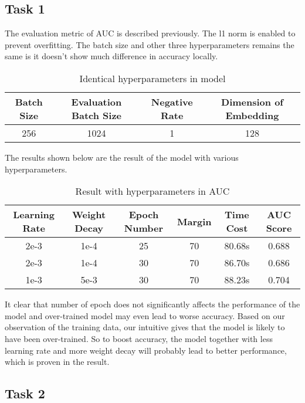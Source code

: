 \documentclass{article}
\begin{document}
\subsection{Task 1}

The evaluation metric of AUC is described previously. The l1 norm is enabled to prevent overfitting. The batch size and other three hyperparameters remains the same is it doesn't show much difference in accuracy locally.

\begin{table}[!htbp]
\setlength{\abovecaptionskip}{+0.2cm}
\setlength{\belowcaptionskip}{+0.2cm}
\centering
\caption{Identical hyperparameters in model}
\begin{tabular}{cccc}
\toprule
\textbf{Batch Size} & \textbf{Evaluation Batch Size} & \textbf{Negative Rate} & \textbf{Dimension of Embedding}\\
\midrule
256 & 1024 & 1 & 128 \\
\bottomrule
\end{tabular}
\end{table}

The results shown below are the result of the model with various hyperparameters. 
\begin{table}[!htbp]
\setlength{\abovecaptionskip}{+0.2cm}
\setlength{\belowcaptionskip}{+0.2cm}
\centering
\caption{Result with hyperparameters in AUC}
\begin{tabular}{cccccc}
\toprule
\textbf{Learning Rate} & \textbf{Weight Decay} & \textbf{Epoch Number} & \textbf{Margin} & \textbf{Time Cost} & \textbf{AUC Score} \\ 
\midrule
2e-3 & 1e-4 & 25 & 70 & 80.68s & 0.688 \\
2e-3 & 1e-4 & 30 & 70 & 86.70s & 0.686 \\
1e-3 & 5e-3 & 30 & 70 & 88.23s & 0.704 \\
\bottomrule
\end{tabular}
\end{table}

It clear that number of epoch does not significantly affects the
performance of the model and over-trained model may even lead to worse accuracy.
Based on our observation of the training data, our intuitive gives that the model is likely to have been over-trained. So to boost accuracy, the model together with less learning rate and more weight decay will probably lead to better performance, which is proven in the result.

\subsection{Task 2}
\end{document}
